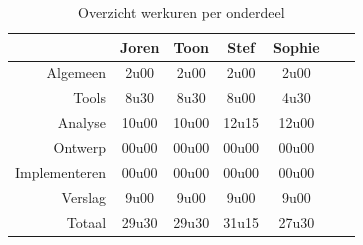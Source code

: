\documentclass[i1]{oss}
\begin{document}

\begin{table}[h!]
\begin{center}
    \begin{tabular}{ r | c  c  c  c  c  c}
     & Joren & Toon & Stef & Sophie \\ \hline
    Algemeen & 2u00 & 2u00 & 2u00 & 2u00\\
           Tools & 8u30 & 8u30 & 8u00 & 4u30 \\
        Analyse & 10u00 & 10u00 & 12u15 & 12u00 \\
        Ontwerp & 00u00 & 00u00 & 00u00 & 00u00 \\
        Implementeren & 00u00 & 00u00 & 00u00 & 00u00\\
        Verslag & 9u00 & 9u00 & 9u00 & 9u00 \\
        Totaal & 29u30 & 29u30 & 31u15 & 27u30  
    \end{tabular}
    \caption{Overzicht werkuren per onderdeel}
    \label{tab:werkuren}
\end{center}
\end{table}
\end{document}
